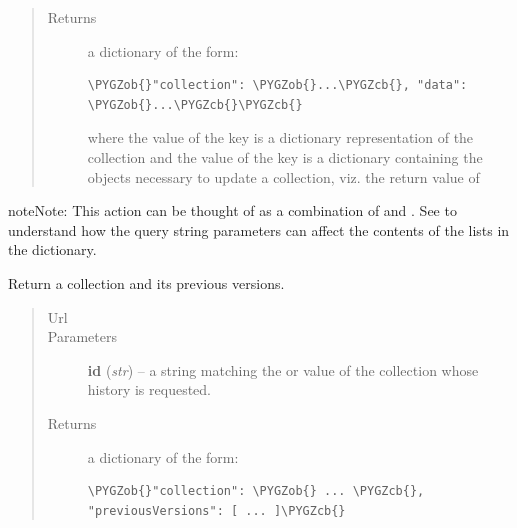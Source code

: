 \documentclass[letterpaper,10pt,english]{sphinxmanual}
\def\PYGZob{\char`\{}
\def\PYGZcb{\char`\}}
\begin{document}
\begin{fulllineitems}
\begin{fulllineitems}
\begin{quote}
\begin{description}
\item[{Returns}] \leavevmode

a dictionary of the form:

\begin{Verbatim}[commandchars=\\\{\}]
\PYGZob{}"collection": \PYGZob{}...\PYGZcb{}, "data": \PYGZob{}...\PYGZcb{}\PYGZcb{}
\end{Verbatim}

where the value of the  key is a dictionary
representation of the collection and the value of the  key
is a dictionary containing the objects necessary to update a
collection, viz. the return value of


\end{description}\end{quote}

\begin{notice}{note}{Note:}
This action can be thought of as a combination of
 and
.  See
 to understand how the query string
parameters can affect the contents of the lists in the 
dictionary.
\end{notice}

\end{fulllineitems}


\begin{fulllineitems}
\label{api:onlinelinguisticdatabase.controllers.oldcollections.OldcollectionsController.history}
Return a collection and its previous versions.
\begin{quote}\begin{description}
\item[{Url }] \leavevmode
{}

\item[{Parameters}] \leavevmode
\textbf{id} (\emph{str}) -- a string matching the  or  value of the
collection whose history is requested.

\item[{Returns}] \leavevmode

a dictionary of the form:

\begin{Verbatim}[commandchars=\\\{\}]
\PYGZob{}"collection": \PYGZob{} ... \PYGZcb{}, "previousVersions": [ ... ]\PYGZcb{}
\end{Verbatim}


\end{description}
\end{quote}
\end{fulllineitems}
\end{fulllineitems}
\end{document}
